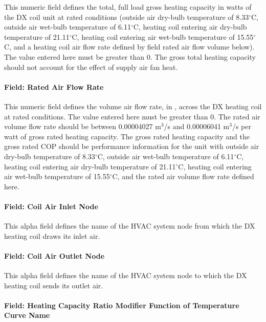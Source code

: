 This numeric field defines the total, full load gross heating capacity in watts of the DX coil unit at rated conditions (outside air dry-bulb temperature of 8.33$^\circ$C, outside air wet-bulb temperature of 6.11$^\circ$C, heating coil entering air dry-bulb temperature of 21.11$^\circ$C, heating coil entering air wet-bulb temperature of 15.55$^\circ$C, and a heating coil air flow rate defined by field rated air flow volume below). The value entered here must be greater than 0. The gross total heating capacity should not account for the effect of supply air fan heat.

\paragraph{Field: Rated Air Flow Rate}\label{field-rated-air-flow-rate-1}

This numeric field defines the volume air flow rate, in \si{\volumeFlowRate}, across the DX heating coil at rated conditions. The value entered here must be greater than 0. The rated air volume flow rate should be between 0.00004027 m\(^{3}\)/s and 0.00006041 m\(^{3}\)/s per watt of gross rated heating capacity. The gross rated heating capacity and the gross rated COP should be performance information for the unit with outside air dry-bulb temperature of 8.33$^\circ$C, outside air wet-bulb temperature of 6.11$^\circ$C, heating coil entering air dry-bulb temperature of 21.11$^\circ$C, heating coil entering air wet-bulb temperature of 15.55$^\circ$C, and the rated air volume flow rate defined here.

\paragraph{Field: Coil Air Inlet Node}\label{field-coil-air-inlet-node}

This alpha field defines the name of the HVAC system node from which the DX heating coil draws its inlet air.

\paragraph{Field: Coil Air Outlet Node}\label{field-coil-air-outlet-node}

This alpha field defines the name of the HVAC system node to which the DX heating coil sends its outlet air.

\paragraph{Field: Heating Capacity Ratio Modifier Function of Temperature Curve Name}\label{field-heating-capacity-ratio-modifier-function-of-temperature-curve-name}

